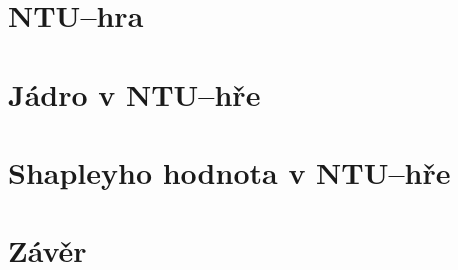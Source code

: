 \section{NTU--hra}
    \label{sec:NTU}
    \lipsum[1]

\section{Jádro v NTU--hře}
    \label{sec:Core}
    \lipsum[1]

\section{Shapleyho hodnota v NTU--hře}
    \label{sec:Shapley}
    \lipsum[1]

\section{Závěr}
    \lipsum[1]
